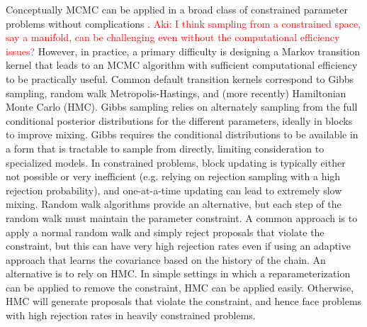 \documentclass[10pt]{article}
\newcommand{\aki}[1]{\textcolor{red}{Aki: #1}}
\DeclareMathOperator{\1}{\mathbbm{1}}
\begin{document}
Conceptually MCMC can be applied in a broad class of constrained parameter problems without complications \cite{gelfand1992bayesian}. \aki{I think sampling from a constrained space, say a manifold, can be challenging even without the computational efficiency issues?} However, in practice, a primary difficulty is designing a Markov transition kernel that leads to an MCMC algorithm with sufficient computational efficiency to be practically useful. Common default transition kernels correspond to Gibbs sampling, random walk Metropolis-Hastings, and (more recently) Hamiltonian Monte Carlo (HMC). Gibbs sampling relies on alternately sampling from the full conditional posterior distributions for the different parameters, ideally in blocks to improve mixing. Gibbs requires the conditional distributions to be available in a form that is tractable to sample from directly, limiting consideration to specialized models. In constrained problems, block updating is typically either not possible or very inefficient (e.g. relying on rejection sampling with a high rejection probability), and one-at-a-time updating can lead to extremely slow mixing. Random walk algorithms provide an alternative, but each step of the random walk must maintain the parameter constraint. A common approach is to apply a normal random walk and simply reject proposals that violate the constraint, but this can have very high rejection rates even if using an adaptive approach that learns the covariance based on the history of the chain. An alternative is to rely on HMC. In simple settings in which a reparameterization can be applied to remove the constraint, HMC can be applied easily. Otherwise, HMC will generate proposals that violate the constraint, and hence face problems with high rejection rates in heavily constrained problems.
\end{document}
